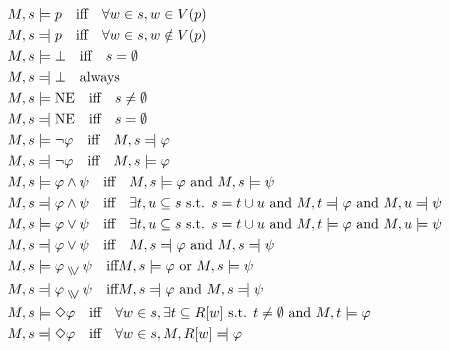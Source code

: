 \begin{align*}
M, s &\models p \quad \text{iff} \quad \forall w \in s, w \in V(p) \\
M, s &\leftmodels p \quad \text{iff} \quad \forall w \in s, w \notin V(p) \\
M, s &\models \bot \quad \text{iff} \quad s = \emptyset \\
M, s &\leftmodels \bot \quad \text{always} \\
M, s &\models \text{NE} \quad \text{iff} \quad s \neq \emptyset \\
M, s &\leftmodels  \text{NE} \quad \text{iff} \quad s = \emptyset \\
M, s &\models \neg \varphi \quad \text{iff} \quad M, s \leftmodels \varphi \\
M, s &\leftmodels  \neg \varphi \quad \text{iff} \quad M, s \models \varphi \\
M, s &\models \varphi \land \psi \quad \text{iff} \quad M, s \models \varphi \text{ and } M, s \models \psi \\
M, s &\leftmodels  \varphi \land \psi \quad \text{iff} \quad \exists t, u \subseteq s \text{ s.t. } s = t \cup u \text{ and } M, t \leftmodels \varphi \text{ and } M, u \leftmodels \psi \\
M, s &\models \varphi \lor \psi \quad \text{iff} \quad \exists t, u \subseteq s \text{ s.t. } s = t \cup u \text{ and } M, t \models \varphi \text{ and } M, u \models \psi \\
M, s &\leftmodels \varphi \lor \psi \quad \text{iff} \quad M, s \leftmodels \varphi \text{ and } M, s \leftmodels \psi \\
M, s &\models \varphi \inqdisj \psi \quad \text{iff} M, s \models \varphi \text{ or } M, s \models \psi \\
M, s &\leftmodels \varphi \inqdisj \psi \quad \text{iff} M, s \leftmodels\varphi \text{ and } M, s \leftmodels \psi\\
M, s &\models \Diamond \varphi \quad \text{iff} \quad \forall w \in s, \exists t \subseteq R[w] \text{ s.t. } t \neq \emptyset \text{ and } M, t \models \varphi \\
M, s &\leftmodels  \Diamond \varphi \quad \text{iff} \quad \forall w \in s, M, R[w] \leftmodels \varphi
\end{align*}
